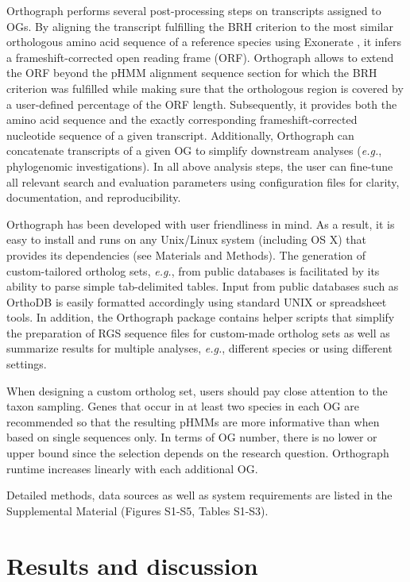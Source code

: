 Orthograph performs several post-processing steps on transcripts
assigned to OGs. By aligning the transcript fulfilling the BRH criterion
to the most similar orthologous amino acid sequence of a reference
species using Exonerate \cite{Slater2005}, it infers a
frameshift-corrected open reading frame (ORF). Orthograph allows to
extend the ORF beyond the pHMM alignment sequence section for which the
BRH criterion was fulfilled while making sure that the orthologous
region is covered by a user-defined percentage of the ORF length.
Subsequently, it provides both the amino acid sequence and the exactly
corresponding frameshift-corrected nucleotide sequence of a given
transcript. Additionally, Orthograph can concatenate transcripts of a
given OG to simplify downstream analyses (\emph{e.g.}, phylogenomic
investigations). In all above analysis steps, the user can fine-tune all
relevant search and evaluation parameters using configuration files for
clarity, documentation, and reproducibility.

Orthograph has been developed with user friendliness in mind. As a
result, it is easy to install and runs on any Unix/Linux system
(including OS X) that provides its dependencies (see Materials and
Methods). The generation of custom-tailored ortholog sets, \emph{e.g.},
from public databases is facilitated by its ability to parse simple
tab-delimited tables. Input from public databases such as OrthoDB is
easily formatted accordingly using standard UNIX or spreadsheet tools.
In addition, the Orthograph package contains helper scripts that
simplify the preparation of RGS sequence files for custom-made ortholog
sets as well as summarize results for multiple analyses, \emph{e.g.},
different species or using different settings.

When designing a custom ortholog set, users should pay close attention
to the taxon sampling. Genes that occur in at least two species in each
OG are recommended so that the resulting pHMMs are more informative than
when based on single sequences only. In terms of OG number, there is no
lower or upper bound since the selection depends on the research
question. Orthograph runtime increases linearly with each additional OG.

Detailed methods, data sources as well as system requirements are listed
in the Supplemental Material (Figures S1-S5, Tables S1-S3).

\section{Results and discussion}\label{results-and-discussion}

